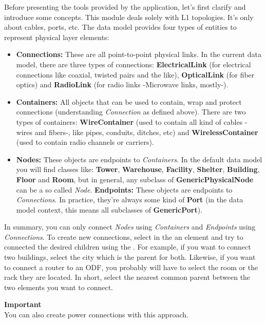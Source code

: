 \documentclass[a4paper]{article}
\begin{document}
		Before presenting the tools provided by the application, let's first clarify and introduce some concepts. This module deals solely with L1 topologies. It's only about cables, ports, etc. The data model provides four types of entities to represent physical layer elements:
		\begin{itemize}
			\item \textbf{Connections:} These are all point-to-point physical links. In the current data model, there are three	types of connections: \textbf{ElectricalLink} (for electrical connections like coaxial, twisted
			pairs and the like), \textbf{OpticalLink} (for fiber optics) and \textbf{RadioLink} (for radio links -Microwave links, mostly-).
			\item \textbf{Containers:} All objects that can be used to contain, wrap and protect connections (understanding \textit{Connection} as defined above). There are two types of containers: \textbf{WireContainer} (used to contain all kind of cables -wires and fibers-, like pipes, conduits, ditches, etc) and \textbf{WirelessContainer} (used to contain radio channels or carriers).
			\item \textbf{Nodes:} These objects are endpoints to \textit{Containers}. In the default data model you will find classes like: \textbf{Tower}, \textbf{Warehouse}, \textbf{Facility}, \textbf{Shelter}, \textbf{Building}, \textbf{Floor} and \textbf{Room}, but in general, any subclass of \textbf{GenericPhysicalNode} can be a so called \textit{Node}.
			\textbf{Endpoints:} These objects are endpoints to \textit{Connections}. In practice, they're always some kind of \textbf{Port} (in the data model context, this means all subclasses of \textbf{GenericPort}).
		\end{itemize}
		In summary, you can only connect \textit{Nodes} using \textit{Containers} and \textit{Endpoints} using \textit{Connections}. To create new connections, select in the \textbf{} an element and try to connected the desired children using the . For example, if you want to connect two buildings, select the city which is the parent for both. Likewise, if you want to connect a router to an ODF, you probably will have to select the room or the rack they are located. In short, select the nearest common parent between the two elements you want to connect.
		\begin{framed} {\large \textbf{Important}}\\
			You can also create power connections with this approach.
		\end{framed}
\end{document}
